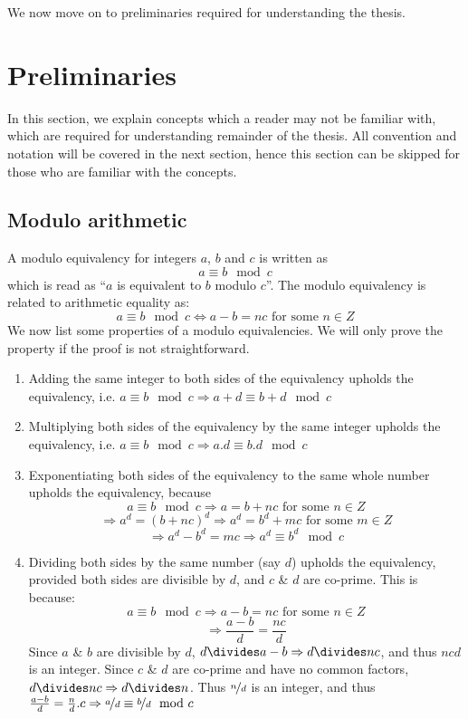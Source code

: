 \documentclass{report}
\begin{document}
We now move on to preliminaries required for understanding the thesis.
%
%
\section{Preliminaries}
In this section, we explain concepts which a reader may not be familiar with, which are required for understanding remainder of the thesis. All convention and notation will be covered in the next section, hence this section can be skipped for those who are familiar with the concepts.
\subsection{Modulo arithmetic}
A modulo equivalency for integers $a$, $b$ and $c$ is written as
\[a\equiv b\mod c\]
which is read as ``$a$ is equivalent to $b$ modulo $c$''. The modulo equivalency is related to arithmetic equality as:
\[a\equiv b\mod  c \Leftrightarrow a-b = nc\text{ for some }n\in Z\]
We now list some properties of a modulo equivalencies. We will only prove the property if the proof is not straightforward.
\begin{enumerate}
    \item Adding the same integer to both sides of the equivalency upholds the equivalency, i.e. $a\equiv b\mod  c \Rightarrow a+d\equiv b+d\mod  c$
    \item Multiplying both sides of the equivalency by the same integer upholds the equivalency, i.e. $a\equiv b\mod  c \Rightarrow a.d\equiv b.d\mod  c$
    \item Exponentiating both sides of the equivalency to the same whole number upholds the equivalency, because
    \[a\equiv b\mod c \Rightarrow a = b+ nc\text{ for some }n\in Z\]
    \[\Rightarrow a^d = (b + nc)^d \Rightarrow a^d = b^d + mc \text{ for some }m\in Z\]
    \[\Rightarrow a^d - b^d = mc \Rightarrow a^d\equiv b^d\mod  c\]
    \item Dividing both sides by the same number (say $d$) upholds the equivalency, provided both sides are divisible by $d$, and $c$ \& $d$ are co-prime. This is because:
    \[a\equiv b\mod  c \Rightarrow a-b = nc\text{ for some }n\in Z\]
    \[\Rightarrow \frac{a-b}{d} = \frac{nc}{d}\]
    Since $a$ \& $b$ are divisible by $d$, $d\divides a-b \Rightarrow d\divides nc$, and thus ${nc}{d}$ is an integer. Since $c$ \& $d$ are co-prime and have no common factors, $d\divides nc \Rightarrow d \divides n$.  Thus $\nicefrac{n}{d}$ is an integer, and thus $\frac{a-b}{d} = \frac{n}{d}.c \Rightarrow \nicefrac{a}{d}\equiv \nicefrac{b}{d}\mod  c$
\end{enumerate}
%
\end{document}
